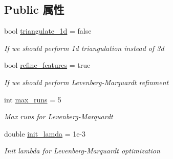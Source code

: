 \subsection*{Public 属性}
\begin{DoxyCompactItemize}
\item 
\mbox{\label{structov__core_1_1FeatureInitializerOptions_aa55a78626d15ac6051ca0f7a5227d175}} 
bool \hyperlink{structov__core_1_1FeatureInitializerOptions_aa55a78626d15ac6051ca0f7a5227d175}{triangulate\+\_\+1d} = false
\begin{DoxyCompactList}\small\item\em If we should perform 1d triangulation instead of 3d \end{DoxyCompactList}\item 
\mbox{\label{structov__core_1_1FeatureInitializerOptions_a5d67f467e1becbdc56132efb13f16992}} 
bool \hyperlink{structov__core_1_1FeatureInitializerOptions_a5d67f467e1becbdc56132efb13f16992}{refine\+\_\+features} = true
\begin{DoxyCompactList}\small\item\em If we should perform Levenberg-\/\+Marquardt refinment \end{DoxyCompactList}\item 
\mbox{\label{structov__core_1_1FeatureInitializerOptions_a413a780bdbc3fa28267d4b88f5f8106a}} 
int \hyperlink{structov__core_1_1FeatureInitializerOptions_a413a780bdbc3fa28267d4b88f5f8106a}{max\+\_\+runs} = 5
\begin{DoxyCompactList}\small\item\em Max runs for Levenberg-\/\+Marquardt \end{DoxyCompactList}\item 
\mbox{\label{structov__core_1_1FeatureInitializerOptions_a0228000bac963fb9125172a30dfe0b47}} 
double \hyperlink{structov__core_1_1FeatureInitializerOptions_a0228000bac963fb9125172a30dfe0b47}{init\+\_\+lamda} = 1e-\/3
\begin{DoxyCompactList}\small\item\em Init lambda for Levenberg-\/\+Marquardt optimization \end{DoxyCompactList}\item 

\end{DoxyCompactItemize}
